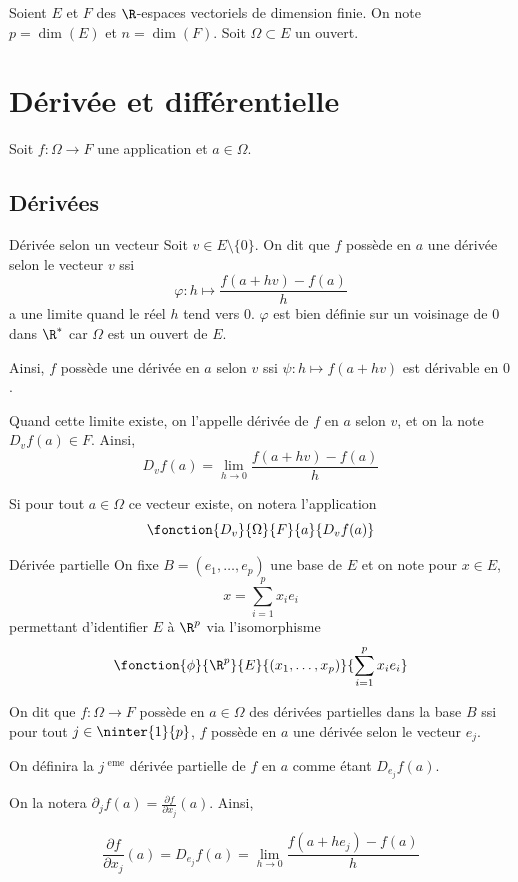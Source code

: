 Soient $E$ et $F$ des $\R$-espaces vectoriels de dimension finie. 
On note $p = \dim(E)$ et $n = \dim(F)$.
Soit $\Omega \subset E$ un ouvert. 

\section{Dérivée et différentielle}

Soit $f : \Omega \to F$ une application et $a \in \Omega$.

\subsection{Dérivées}

\begin{definition}{Dérivée selon un vecteur}{}
    Soit $v \in E \setminus \{0\}$. On dit que $f$ possède en $a$ une dérivée selon le vecteur $v$ ssi 
    \[
        \varphi : h \mapsto \frac {f(a + hv) - f(a)} h 
    \]
    a une limite quand le réel $h$ tend vers $0$. $\varphi$ est bien définie sur un voisinage de $0$
    dans $\R^*$ car $\Omega$ est un ouvert de $E$.

    Ainsi, $f$ possède une dérivée en $a$ selon $v$ ssi $\psi : h \mapsto f(a + hv)$ 
    est dérivable en $0$. 

    Quand cette limite existe, on l'appelle dérivée de $f$ en $a$ selon $v$, 
    et on la note $D_v f(a) \in F$. Ainsi, 
    \[
        D_v f(a) = \lim_{h \to 0} \frac{f(a + hv) - f(a)}{h}
    \]

    Si pour tout $a \in \Omega$ ce vecteur existe, on notera l'application
    \[ \fonction{D_v}{\Omega}{F}{a}{D_v f(a)} \]
\end{definition}


\begin{definition}{Dérivée partielle}{}
    On fixe $B = (e_1, \ldots, e_p)$ une base de $E$ et on note pour $x \in E$, 
    $$x = \sum_{i=1}^p x_i e_i$$
    permettant d'identifier $E$ à $\R^p$ via l'isomorphisme 
    \[ \fonction{\phi}{\R^p}{E}{(x_1, \ldots, x_p)}{\sum_{i=1}^p x_i e_i} \]

    On dit que $f : \Omega \to F$ possède en $a \in \Omega$ des dérivées partielles dans la base
    $B$ ssi pour tout $j \in \ninter{1}{p}$, $f$ possède en $a$ une dérivée selon le vecteur 
    $e_j$. 

    On définira la $j^{\text{ eme}}$ dérivée partielle de $f$ en $a$ comme étant $D_{e_j} f (a)$. 

    On la notera $\partial_j f(a) = \frac{\partial f}{\partial x_j} (a)$. Ainsi, 

    $$\frac{\partial f}{\partial x_j}(a) = D_{e_j} f(a) = \lim_{h \to 0} \frac{f(a + h e_j) - f(a)}{h}$$
\end{definition}


